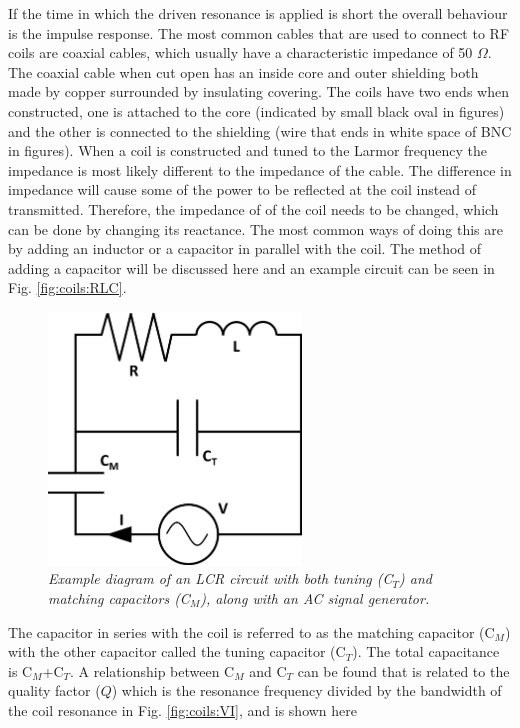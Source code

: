 If the time in which the driven resonance is applied is short the overall behaviour is the impulse response. The most common cables that are used to connect to \ac{RF} coils are coaxial cables, which usually have a characteristic impedance of 50 $\Omega$. The coaxial cable when cut open has an inside core and outer shielding both made by copper surrounded by insulating covering. The coils have two ends when constructed, one is attached to the core (indicated by small black oval in figures) and the other is connected to the shielding (wire that ends in white space of BNC in figures). When a coil is constructed and tuned to the Larmor frequency the impedance is most likely different to the impedance of the cable. The difference in impedance will cause some of the power to be reflected at the coil instead of transmitted. Therefore, the impedance of of the coil needs to be changed, which can be done by changing its reactance. The most common ways of doing this are by adding an inductor or a capacitor in parallel with the coil. The method of adding a capacitor will be discussed here and an example circuit can be seen in Fig. \ref{fig:coils:RLC}.

\begin{figure}
    \centering
    \includegraphics[width=0.6\textwidth]{Figures/Coils/RLC_Circuit_Match.png}
    \caption{\textit{Example diagram of an LCR circuit with both tuning (C$_T$) and matching capacitors (C$_M$), along with an AC signal generator.}}
    \label{fig:coils:RLC_match}
\end{figure}

The capacitor in series with the coil is referred to as the matching capacitor (C$_M$) with the other capacitor called the tuning capacitor (C$_T$). The total capacitance is C$_M$+C$_T$. A relationship between C$_M$ and C$_T$ can be found that is related to the quality factor ($Q$) \cite{Chen1989ChapterNoise} which is the resonance frequency divided by the bandwidth of the coil resonance in Fig. \ref{fig:coils:VI}, and is shown here

